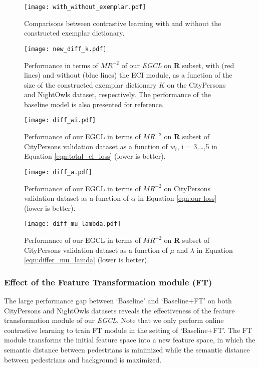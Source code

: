 \documentclass[journal]{IEEEtran}
\begin{document}
\begin{figure}[t]
\centering
    \texttt{[image: with\_without\_exemplar.pdf]}
\caption{Comparisons between contrastive learning with and without the constructed exemplar dictionary.}
\label{Fig:with_without_exemplars}
\end{figure}
\begin{figure}[t]
\centering
    \texttt{[image: new\_diff\_k.pdf]}
\caption{Performance in terms of $MR^{-2}$ of our \emph{EGCL} on \textbf{R} subset, with (red lines) and without (blue lines) the ECI module, as a function of the size of the constructed exemplar dictionary $K$ on the CityPersons and NightOwls dataset, respectively. The performance of the baseline model is also presented for reference.}
\label{Fig:diff_k}
\end{figure}


\begin{figure}[t]
\centering
    \texttt{[image: diff\_wi.pdf]}
\caption{Performance of our EGCL in terms of $MR^{-2}$ on \textbf{R} subset of CityPersons validation dataset as a function of $w_{i}$, i = 3,\dots,5 in Equation \ref{eqn:total_cl_loss} (lower is better).}
\label{Fig:diff_wi}
\end{figure}

\begin{figure}[t]
\centering
    \texttt{[image: diff\_a.pdf]}
\caption{
    Performance of our EGCL in terms of $MR^{-2}$ on CityPersons validation dataset as a function of $\alpha$ in Equation \ref{eqn:our-loss} (lower is better).} 
\label{Fig:diff_alpha}
\end{figure}
\begin{figure}[t]
\centering
    \texttt{[image: diff\_mu\_lambda.pdf]}
\caption{Performance of our EGCL in terms of $MR^{-2}$ on \textbf{R} subset of CityPersons validation dataset as a function of $\mu$  and $\lambda$ in Equation \ref{eqn:differ_mu_lamda} (lower is better).} 
\label{Fig:diff_mu_lambda}
\end{figure}



\subsubsection{Effect of the Feature Transformation module (FT)}
The large performance gap between `Baseline' and `Baseline+FT' on both CityPersons and NightOwls datasets reveals the effectiveness of the feature transformation module of our \emph{EGCL}. Note that we only perform online contrastive learning to train FT module in the setting of `Baseline+FT'. The FT module transforms the initial feature space into a new feature space, in which the semantic distance between pedestrians is minimized while the semantic distance between pedestrians and background is maximized. 
\end{document}
